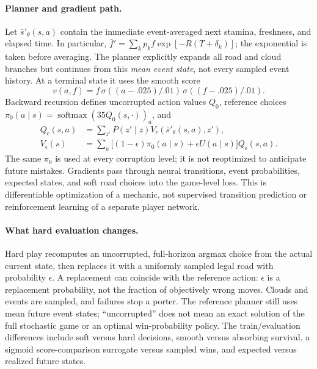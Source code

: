 \paragraph{Planner and gradient path.}
Let $\bar{s}'_\theta(s,a)$ contain the immediate event-averaged next stamina,
freshness, and elapsed time. In particular,
$\bar f'=\sum_k p_k f\exp[-R(T+\delta_k)]$; the exponential is taken before
averaging. The planner explicitly expands all road and cloud branches but
continues from this \emph{mean event state}, not every sampled event history.
At a terminal state it uses the smooth score
\begin{equation}
 v(a,f)=f\,\sigma((a-.025)/.01)\,\sigma((f-.025)/.01).
\end{equation}
Backward recursion defines uncorrupted action values $Q_0$, reference choices
$\pi_0(a\mid s)=\operatorname{softmax}(35Q_0(s,\cdot))_a$, and
\begin{align}
 Q_\epsilon(s,a)&=\sum_{z'}P(z'\mid z)
 V_\epsilon(\bar{s}'_\theta(s,a),z'),\\
 V_\epsilon(s)&=\sum_a\bigl[(1-\epsilon)\pi_0(a\mid s)+\epsilon U(a\mid s)\bigr]
 Q_\epsilon(s,a).
\end{align}
The same $\pi_0$ is used at every corruption level; it is not reoptimized to
anticipate future mistakes. Gradients pass through neural transitions, event
probabilities, expected states, and soft road choices into the game-level loss.
This is differentiable optimization of a mechanic, not supervised transition
prediction or reinforcement learning of a separate player network.

\paragraph{What hard evaluation changes.}
Hard play recomputes an uncorrupted, full-horizon argmax choice from the actual
current state, then replaces it with a uniformly sampled legal road with
probability $\epsilon$. A replacement can coincide with the reference action:
$\epsilon$ is a replacement probability, not the fraction of objectively wrong
moves. Clouds and events are sampled, and failures stop a porter. The reference
planner still uses mean future event states; ``uncorrupted'' does not mean an
exact solution of the full stochastic game or an optimal win-probability policy.
The train/evaluation differences include soft versus hard decisions, smooth
versus absorbing survival, a sigmoid score-comparison surrogate versus sampled
wins, and expected versus realized future states.

